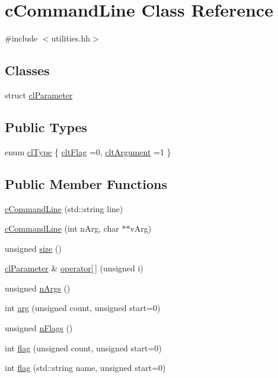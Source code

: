\hypertarget{classcCommandLine}{\section{c\-Command\-Line Class Reference}
\label{classcCommandLine}
}


{\ttfamily \#include $<$utilities.\-hh$>$}

\subsection*{Classes}
\begin{DoxyCompactItemize}
\item 
struct \hyperlink{structcCommandLine_1_1clParameter}{cl\-Parameter}
\end{DoxyCompactItemize}
\subsection*{Public Types}
\begin{DoxyCompactItemize}
\item 
enum \hyperlink{classcCommandLine_a81ec4892969530bbd91486e6cb872054}{cl\-Type} \{ \hyperlink{classcCommandLine_a81ec4892969530bbd91486e6cb872054ae373dbf7e049b7d7fdbe75c4f91696cd}{clt\-Flag} =0, 
\hyperlink{classcCommandLine_a81ec4892969530bbd91486e6cb872054abf74da44500e2e049b5e00063306ee2e}{clt\-Argument} =1
 \}
\end{DoxyCompactItemize}
\subsection*{Public Member Functions}
\begin{DoxyCompactItemize}
\item 
\hyperlink{classcCommandLine_a70d7d8db2e25e26954221680f4f81bbd}{c\-Command\-Line} (std\-::string line)
\item 
\hyperlink{classcCommandLine_adef219a87317597446f866f7a1eaffe3}{c\-Command\-Line} (int n\-Arg, char $\ast$$\ast$v\-Arg)
\item 
unsigned \hyperlink{classcCommandLine_a80abb1b2a58d6d5488cda091914e9df6}{size} ()
\item 
\hyperlink{structcCommandLine_1_1clParameter}{cl\-Parameter} \& \hyperlink{classcCommandLine_acad9f993c21ecb3482c75f90c5135af4}{operator\mbox{[}$\,$\mbox{]}} (unsigned i)
\item 
unsigned \hyperlink{classcCommandLine_a11eca9b05e112b94f4414e89e85923f9}{n\-Args} ()
\item 
int \hyperlink{classcCommandLine_a60f9b1445b6bc0a18bcf360be2b9fa36}{arg} (unsigned count, unsigned start=0)
\item 
unsigned \hyperlink{classcCommandLine_a9ae109a4421ca07494fae4a62fb65961}{n\-Flags} ()
\item 
int \hyperlink{classcCommandLine_aaf01c0441e4aec3cb5d0590051265fce}{flag} (unsigned count, unsigned start=0)
\item 
int \hyperlink{classcCommandLine_aaa0c5f1a6c7e7bf2db5525595c78a38f}{flag} (std\-::string name, unsigned start=0)
\end{DoxyCompactItemize}
